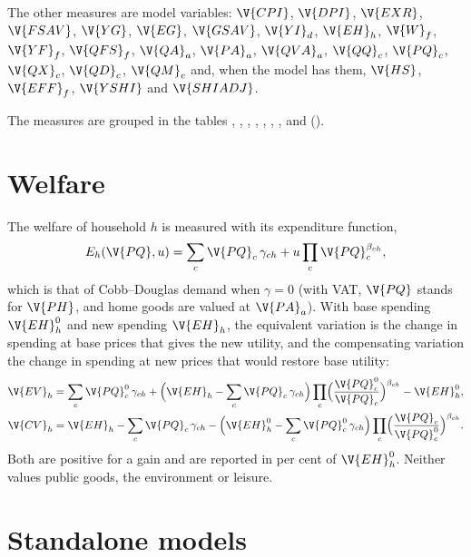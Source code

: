 The other measures are model variables: $\V{CPI}$, $\V{DPI}$, $\V{EXR}$,
$\V{FSAV}$, $\V{YG}$, $\V{EG}$, $\V{GSAV}$, $\V{YI}_d$, $\V{EH}_h$, $\V{W}_f$,
$\V{YF}_f$, $\V{QFS}_f$, $\V{QA}_a$, $\V{PA}_a$, $\V{QVA}_a$, $\V{QQ}_c$,
$\V{PQ}_c$, $\V{QX}_c$, $\V{QD}_c$, $\V{QM}_c$ and, when the model has them,
$\V{HS}$, $\V{EFF}_f$, $\V{YSHI}$ and $\V{SHIADJ}$.

The measures are grouped in the tables , ,
, , , ,
,  and  ().

\section{Welfare}\label{sec:welfare}

The welfare of household $h$ is measured with its expenditure function,
\begin{equation*}
E_h(\V{PQ}, u) = \sum_c \V{PQ}_c\,\gamma_{ch} + u \prod_c \V{PQ}_c^{\beta_{ch}},
\end{equation*}
which is that of Cobb--Douglas demand when $\gamma = 0$ (with VAT, $\V{PQ}$
stands for $\V{PH}$, and home goods are valued at $\V{PA}_a$). With base
spending $\V{EH}^0_h$ and new spending $\V{EH}_h$, the equivalent variation is
the change in spending at base prices that gives the new utility, and the
compensating variation the change in spending at new prices that would restore
base utility:
\begin{align*}
\V{EV}_h &= \sum_c \V{PQ}^0_c\,\gamma_{ch} + \Bigl(\V{EH}_h - \sum_c \V{PQ}_c\,\gamma_{ch}\Bigr)
  \prod_c \Bigl(\frac{\V{PQ}^0_c}{\V{PQ}_c}\Bigr)^{\beta_{ch}} - \V{EH}^0_h,\\
\V{CV}_h &= \V{EH}_h - \sum_c \V{PQ}_c\,\gamma_{ch} - \Bigl(\V{EH}^0_h - \sum_c \V{PQ}^0_c\,\gamma_{ch}\Bigr)
  \prod_c \Bigl(\frac{\V{PQ}_c}{\V{PQ}^0_c}\Bigr)^{\beta_{ch}}.
\end{align*}
Both are positive for a gain and are reported in per cent of $\V{EH}^0_h$.
Neither values public goods, the environment or leisure.

\section{Standalone models}\label{sec:sa-report}

